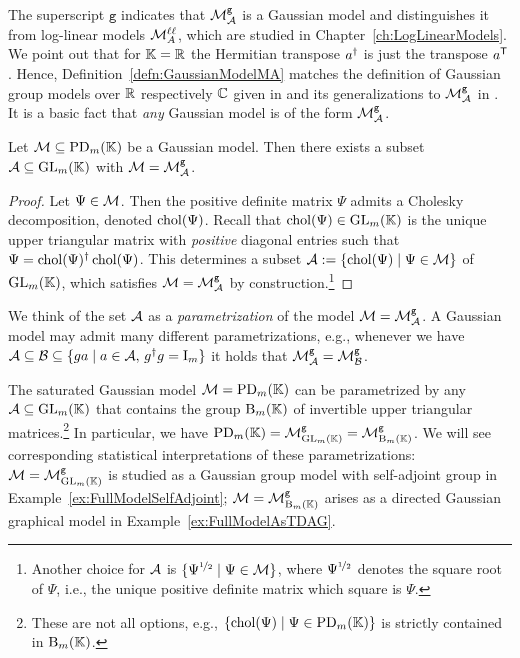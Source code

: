 The superscript $\mathtt{g}$ indicates that $\mathcal{M}^{\mathtt{g}}_{\mathcal{A}}$ is a Gaussian model and distinguishes it from log-linear models $\mathcal{M}^{\mathtt{\ell \ell}}_A$, which are studied in Chapter~\ref{ch:LogLinearModels}. We point out that for $\mathbb K = \mathbb R$ the Hermitian transpose $a^{\dagger}$ is just the transpose $a^{\mathsf{T}}$. Hence, Definition~\ref{defn:GaussianModelMA} matches the definition of Gaussian group models over $\mathbb R$ respectively $\mathbb C$ given in \cite{SiagaPaper} and its generalizations to $\mathcal{M}^{\mathtt{g}}_{\mathcal{A}}$ in \cite{RDAG}.
It is a basic fact that \emph{any} Gaussian model is of the form $\mathcal{M}^{\mathtt{g}}_{\mathcal{A}}$.

\begin{prop}
	Let $\mathcal{M} \subseteq \operatorname{PD}_m(\mathbb K)$ be a Gaussian model. Then there exists a subset $\mathcal{A} \subseteq \operatorname{GL}_m(\mathbb K)$ with $\mathcal{M} = \mathcal{M}^{\mathtt{g}}_{\mathcal{A}}$.
\end{prop}

\begin{proof}
	Let $\Psi \in \mathcal{M}$. Then the positive definite matrix $\Psi$ admits a Cholesky decomposition, denoted $\operatorname{chol}(\Psi)$. Recall that $\operatorname{chol}(\Psi) \in \operatorname{GL}_m(\mathbb K)$ is the unique upper triangular matrix with \emph{positive} diagonal entries such that $\Psi = \operatorname{chol}(\Psi)^{\dagger} \operatorname{chol}(\Psi)$. %
	This determines a subset $\mathcal{A} := \{ \operatorname{chol}(\Psi) \mid \Psi \in \mathcal{M}\}$ of $\operatorname{GL}_m(\mathbb K)$, which satisfies $\mathcal{M} = \mathcal{M}^{\mathtt{g}}_{\mathcal{A}}$ by construction.\footnote{Another choice for $\mathcal{A}$ is $\{ \Psi^{\nicefrac{1}{2}} \mid \Psi \in \mathcal{M} \}$, where $\Psi^{\nicefrac{1}{2}}$ denotes the square root of $\Psi$, i.e., the unique positive definite matrix which square is $\Psi$.}
\end{proof}

\begin{remark}\label{rem:differentAparametrizations}
	We think of the set $\mathcal{A}$ as a \emph{parametrization} %
	of the model $\mathcal{M} = \mathcal{M}^{\mathtt{g}}_{\mathcal{A}}$.
	A Gaussian model may admit many different parametrizations, e.g., whenever we have $\mathcal{A} \subseteq \mathcal{B} \subseteq \{ g a \mid a \in \mathcal{A}, \, g^{\dagger} g = \operatorname{I}_m\}$ it holds that $\mathcal{M}^{\mathtt{g}}_{\mathcal{A}} = \mathcal{M}^{\mathtt{g}}_{\mathcal{B}}$. 
	\hfill\remSymbol
\end{remark}

\begin{example} \label{ex:FullGuassianAsMgA}
	The saturated Gaussian model $\mathcal{M} = \operatorname{PD}_m(\mathbb K)$ can be parametrized by any $\mathcal{A} \subseteq \operatorname{GL}_m(\mathbb K)$ that contains the group  $\operatorname{B}_m(\mathbb K)$ of invertible upper triangular matrices.\footnote{These are not all options, e.g., $\{\operatorname{chol}(\Psi) \mid \Psi \in \operatorname{PD}_m(\mathbb K)\}$ is strictly contained in $\operatorname{B}_m(\mathbb K)$.} In particular, we have $\operatorname{PD}_m(\mathbb K) = \mathcal{M}^{\mathtt{g}}_{\operatorname{GL}_m(\mathbb K)} = \mathcal{M}^{\mathtt{g}}_{\operatorname{B}_m(\mathbb K)}$. We will see corresponding statistical interpretations of these parametrizations: $\mathcal{M}  = \mathcal{M}^{\mathtt{g}}_{\operatorname{GL}_m(\mathbb K)}$ is studied as a Gaussian group model with self-adjoint group in Example~\ref{ex:FullModelSelfAdjoint}; $\mathcal{M} = \mathcal{M}^{\mathtt{g}}_{\operatorname{B}_m(\mathbb K)}$ arises as a directed Gaussian graphical model in Example~\ref{ex:FullModelAsTDAG}.
	\hfill\exSymbol
\end{example}

